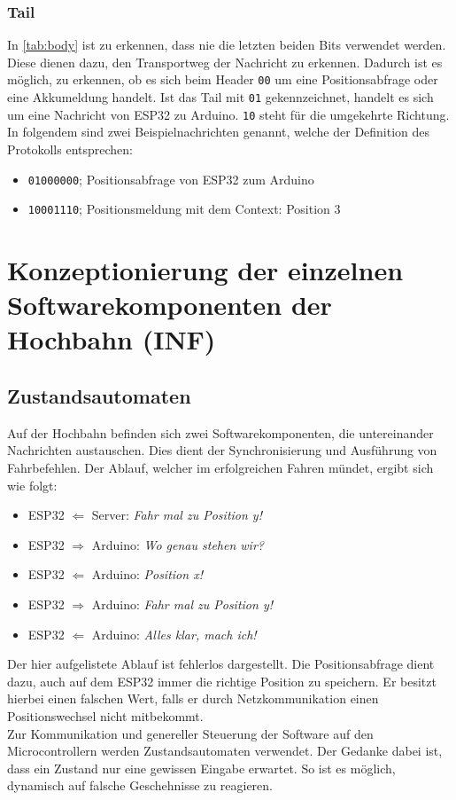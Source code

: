 \subsection{Tail}
In \autoref{tab:body} ist zu erkennen, dass nie die letzten beiden Bits verwendet werden. Diese dienen dazu, den Transportweg der Nachricht zu erkennen. Dadurch ist es möglich, zu erkennen, ob es sich beim Header \texttt{00} um eine Positionsabfrage oder eine Akkumeldung handelt.
Ist das Tail mit \texttt{01} gekennzeichnet, handelt es sich um eine Nachricht von ESP32 zu Arduino. \texttt{10} steht für die umgekehrte Richtung.
In folgendem sind zwei Beispielnachrichten genannt, welche der Definition des Protokolls entsprechen:

\begin{center}
	\begin{itemize}
		\item \texttt{01000000}; Positionsabfrage von ESP32 zum Arduino
		\item \texttt{10001110}; Positionsmeldung mit dem Context: Position 3  
	\end{itemize}
\end{center}
\newpage


\chapter{Konzeptionierung der einzelnen Softwarekomponenten der Hochbahn (INF)}
\section{Zustandsautomaten}
Auf der Hochbahn befinden sich zwei Softwarekomponenten, die untereinander Nachrichten austauschen. Dies dient der Synchronisierung und Ausführung von Fahrbefehlen. Der Ablauf, welcher im erfolgreichen Fahren mündet, ergibt sich wie folgt:
\begin{center}
	\begin{itemize}
		\item ESP32 $\Leftarrow$ Server: \textit{Fahr mal zu Position y!}
		\item ESP32 $\Rightarrow$ Arduino: \textit{Wo genau stehen wir?}
		\item ESP32 $\Leftarrow$ Arduino: \textit{Position x!}
		\item ESP32 $\Rightarrow$ Arduino: \textit{Fahr mal zu Position y!}
		\item ESP32 $\Leftarrow$ Arduino: \textit{Alles klar, mach ich!}
	\end{itemize}
\end{center}
Der hier aufgelistete Ablauf ist fehlerlos dargestellt. Die Positionsabfrage dient dazu, auch auf dem ESP32 immer die richtige Position zu speichern. Er besitzt hierbei einen falschen Wert, falls er durch Netzkommunikation einen Positionswechsel nicht mitbekommt. \\
 Zur Kommunikation und genereller Steuerung der Software auf den Microcontrollern werden Zustandsautomaten verwendet. Der Gedanke dabei ist, dass ein Zustand nur eine gewissen Eingabe erwartet. So ist es möglich, dynamisch auf falsche Geschehnisse zu reagieren.

